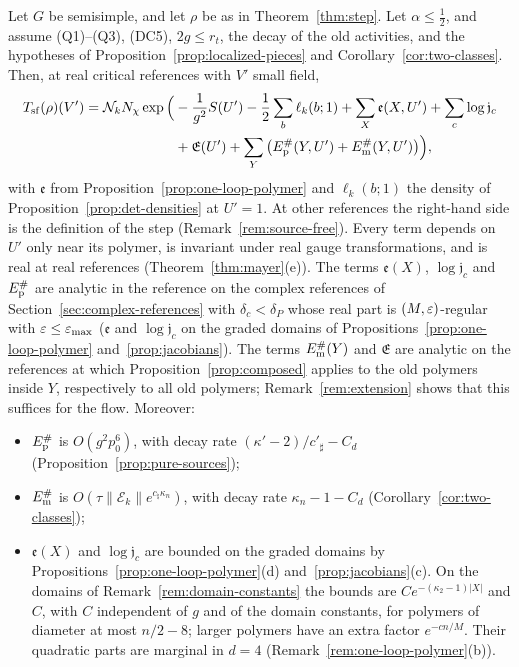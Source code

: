 \begin{theorem}\label{thm:sf-step}
Let $G$ be semisimple, and let $\rho$ be as in Theorem~\ref{thm:step}. Let $\alpha\le\frac12$, and assume (Q1)--(Q3), (DC5), $2g\le r_t$, the decay of the old activities, and the hypotheses of Proposition~\ref{prop:localized-pieces} and Corollary~\ref{cor:two-classes}. Then, at real critical references with $V'$ small field,
\[
\begin{aligned}
T_{\rm sf}(\rho)(V')=\mathcal N_kN_\chi\exp\Big(&-\frac1{g^2}S(U')-\frac12\sum_b\ell_k(b;1)+\sum_X\mathfrak e(X,U')+\sum_c\log\mathfrak j_c\\
&+\mathfrak E(U')+\sum_Y\big(E^\#_{\rm p}(Y,U')+E^\#_{\rm m}(Y,U')\big)\Big),
\end{aligned}
\]
with $\mathfrak e$ from Proposition~\ref{prop:one-loop-polymer} and $\ell_k(b;1)$ the density of Proposition~\ref{prop:det-densities} at $U'=1$. At other references the right-hand side is the definition of the step (Remark~\ref{rem:source-free}). Every term depends on $U'$ only near its polymer, is invariant under real gauge transformations, and is real at real references (Theorem~\ref{thm:mayer}(e)). The terms $\mathfrak e(X)$, $\log\mathfrak j_c$ and $E^\#_{\rm p}$ are analytic in the reference on the complex references of Section~\ref{sec:complex-references} with $\delta_c<\delta_P$ whose real part is $(M,\varepsilon)$-regular with $\varepsilon\le\varepsilon_{\max}$ ($\mathfrak e$ and $\log\mathfrak j_c$ on the graded domains of Propositions~\ref{prop:one-loop-polymer} and~\ref{prop:jacobians}). The terms $E^\#_{\rm m}(Y)$ and $\mathfrak E$ are analytic on the references at which Proposition~\ref{prop:composed} applies to the old polymers inside $Y$, respectively to all old polymers; Remark~\ref{rem:extension} shows that this suffices for the flow. Moreover:
\begin{itemize}
\item $E^\#_{\rm p}$ is $O(g^2p_0^6)$, with decay rate $(\kappa'-2)/c'_\sharp-C_d$ (Proposition~\ref{prop:pure-sources});
\item $E^\#_{\rm m}$ is $O(\tau\|\mathcal E_k\|e^{c_\natural\kappa_n})$, with decay rate $\kappa_n-1-C_d$ (Corollary~\ref{cor:two-classes});
\item $\mathfrak e(X)$ and $\log\mathfrak j_c$ are bounded on the graded domains by Propositions~\ref{prop:one-loop-polymer}(d) and~\ref{prop:jacobians}(c). On the domains of Remark~\ref{rem:domain-constants} the bounds are $Ce^{-(\kappa_2-1)|X|}$ and $C$, with $C$ independent of $g$ and of the domain constants, for polymers of diameter at most $n/2-8$; larger polymers have an extra factor $e^{-cn/M}$. Their quadratic parts are marginal in $d=4$ (Remark~\ref{rem:one-loop-polymer}(b)).

\end{itemize}
\end{theorem}
